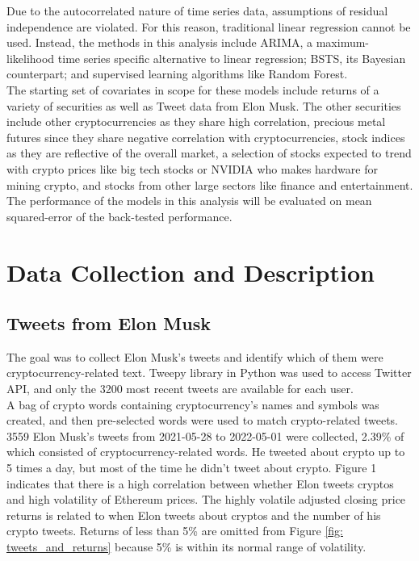 \documentclass{article}
\begin{document}
\noindent Due to the autocorrelated nature of time series data, assumptions of residual independence are violated. For this reason, traditional linear regression cannot be used. Instead, the methods in this analysis include ARIMA, a maximum-likelihood time series specific alternative to linear regression; BSTS, its Bayesian counterpart; and supervised learning algorithms like Random Forest. \\

\noindent The starting set of covariates in scope for these models include returns of a variety of securities as well as Tweet data from Elon Musk. The other securities include other cryptocurrencies as they share high correlation, precious metal futures since they share negative correlation with cryptocurrencies, stock indices as they are reflective of the overall market, a selection of stocks expected to trend with crypto prices like big tech stocks or NVIDIA who makes hardware for mining crypto, and stocks from other large sectors like finance and entertainment.\\

\noindent The performance of the models in this analysis will be evaluated on mean squared-error of the back-tested performance.

\newpage
	
\section{Data Collection and Description}
\subsection{Tweets from Elon Musk}

The goal was to collect Elon Musk’s tweets and identify which of them were cryptocurrency-related text. Tweepy library in Python was used to access Twitter API, and only the 3200 most recent tweets are available for each user.\\

\noindent A bag of crypto words containing cryptocurrency’s names and symbols was created, and then pre-selected words were used to match crypto-related tweets. 3559 Elon Musk’s tweets from 2021-05-28 to 2022-05-01 were collected, 2.39\% of which consisted of cryptocurrency-related words. He tweeted about crypto up to 5 times a day, but most of the time he didn’t tweet about crypto. Figure 1 indicates that there is a high correlation between whether Elon tweets cryptos and high volatility of Ethereum prices. The highly volatile adjusted closing price returns is related to when Elon tweets about cryptos and the number of his crypto tweets. Returns of less than 5\% are omitted from Figure \ref{fig: tweets_and_returns} because 5\% is within its normal range of volatility.
\end{document}
